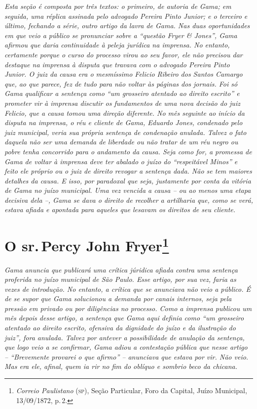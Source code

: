 \begin{argumento}
\emph{Esta seção é composta por três textos: o primeiro, de autoria de
Gama; em seguida, uma réplica assinada pelo advogado Pereira Pinto
Junior; e o terceiro e último, fechando a série, outro artigo da lavra
de Gama. Nas duas oportunidades em que veio a público se pronunciar
sobre a ``questão Fryer \& Jones'', Gama afirmou que daria continuidade à
peleja jurídica na imprensa. No entanto, certamente porque o curso do
processo virou ao seu favor, ele não precisou dar destaque na imprensa à
disputa que travava com o advogado Pereira Pinto Junior. O juiz da causa
era o mesmíssimo Felicio Ribeiro dos Santos Camargo que, ao que parece,
fez de tudo para não voltar às páginas dos jornais. Foi só Gama
qualificar a sentença como ``um grosseiro atentado ao direito escrito'' e
prometer vir à imprensa discutir os fundamentos de uma nova decisão do
juiz Felicio, que a causa tomou uma direção diferente. No mês seguinte
ao início da disputa na imprensa, o réu e cliente de Gama, Eduardo
Jones, condenado pelo juiz municipal, veria sua própria sentença de
condenação anulada. Talvez o fato daquela não ser uma demanda de
liberdade ou não tratar de um réu negro ou pobre tenha concorrido para o
andamento da causa. Seja como for, a promessa de Gama de voltar à
imprensa deve ter abalado o juízo do ``respeitável Minos'' e feito ele
próprio ou o juiz de direito revogar a sentença dada. Não se tem maiores
detalhes da causa. E isso, por paradoxal que seja, justamente por conta
da vitória de Gama no juízo municipal. Uma vez vencida a causa -- ou ao
menos uma etapa decisiva dela --, Gama se dava o direito de recolher a
artilharia que, como se verá, estava afiada e apontada para aqueles que
lesavam os direitos de seu cliente.}
\end{argumento}

\chapter{O sr.\,Percy John Fryer\footnote{\emph{Correio Paulistano} (\textsc{sp}), Seção Particular, Foro da Capital, Juízo Municipal, 13/09/1872, p.\,2.}} %

\begin{didascalia}
\emph{Gama anuncia que publicará uma crítica júridica afiada contra uma
sentença proferida no juízo municipal de São Paulo. Esse artigo, por sua
vez, faria as vezes de introdução. No entanto, a crítica que se
anunciava não veio a público. É de se supor que Gama solucionou a
demanda por canais internos, seja pela pressão em privado ou por
diligências no processo. Como a imprensa publicou um mês depois desse
artigo, a sentença que Gama aqui definia como ``um grosseiro atentado ao
direito escrito, ofensiva da dignidade do juízo e da ilustração do
juiz'', fora anulada. Talvez por antever a possibilidade de anulação da
sentença, que logo veio a se confirmar, Gama adiou a contestação pública
que nesse artigo -- ``Brevemente provarei o que afirmo'' -- anunciava que
estava por vir. Não veio. Mas era ele, afinal, quem ia rir no fim do
oblíquo e sombrio beco da chicana.}
\end{didascalia}

